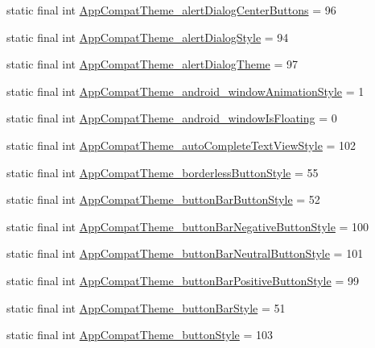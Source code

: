 \begin{CompactItemize}
\item 
static final int \hyperlink{classandroid_1_1support_1_1v4_1_1_r_1_1styleable_8ec720cdfc46d6cc33d23d0459197671}{AppCompatTheme\_\-alertDialogCenterButtons} = 96
\item 
static final int \hyperlink{classandroid_1_1support_1_1v4_1_1_r_1_1styleable_41bab9fb72c63ddb10915533169e3216}{AppCompatTheme\_\-alertDialogStyle} = 94
\item 
static final int \hyperlink{classandroid_1_1support_1_1v4_1_1_r_1_1styleable_58e5759eace5641f42a4605d7670b7da}{AppCompatTheme\_\-alertDialogTheme} = 97
\item 
static final int \hyperlink{classandroid_1_1support_1_1v4_1_1_r_1_1styleable_1d77731fad30decfb99a3a8e55c35700}{AppCompatTheme\_\-android\_\-windowAnimationStyle} = 1
\item 
static final int \hyperlink{classandroid_1_1support_1_1v4_1_1_r_1_1styleable_9692aa9adae84384d1c4a70481a486a6}{AppCompatTheme\_\-android\_\-windowIsFloating} = 0
\item 
static final int \hyperlink{classandroid_1_1support_1_1v4_1_1_r_1_1styleable_8915799c22e82c51ca50dd1d9ff5b50c}{AppCompatTheme\_\-autoCompleteTextViewStyle} = 102
\item 
static final int \hyperlink{classandroid_1_1support_1_1v4_1_1_r_1_1styleable_53709ea62e0ea08225a291fefc09a1b5}{AppCompatTheme\_\-borderlessButtonStyle} = 55
\item 
static final int \hyperlink{classandroid_1_1support_1_1v4_1_1_r_1_1styleable_5392994a38004dcbc49775cdd089d6e9}{AppCompatTheme\_\-buttonBarButtonStyle} = 52
\item 
static final int \hyperlink{classandroid_1_1support_1_1v4_1_1_r_1_1styleable_4a4d3c9d83cb64f07235f8be079992a4}{AppCompatTheme\_\-buttonBarNegativeButtonStyle} = 100
\item 
static final int \hyperlink{classandroid_1_1support_1_1v4_1_1_r_1_1styleable_2e6df35632dfd48914323050d05c0a30}{AppCompatTheme\_\-buttonBarNeutralButtonStyle} = 101
\item 
static final int \hyperlink{classandroid_1_1support_1_1v4_1_1_r_1_1styleable_794f00fd624776c9f0e4eac6e0dd1165}{AppCompatTheme\_\-buttonBarPositiveButtonStyle} = 99
\item 
static final int \hyperlink{classandroid_1_1support_1_1v4_1_1_r_1_1styleable_f62e556ecad9de84a7a256eb8b485488}{AppCompatTheme\_\-buttonBarStyle} = 51
\item 
static final int \hyperlink{classandroid_1_1support_1_1v4_1_1_r_1_1styleable_a567eb6928ba9055a784ae2ad69d63f8}{AppCompatTheme\_\-buttonStyle} = 103

\end{CompactItemize}

